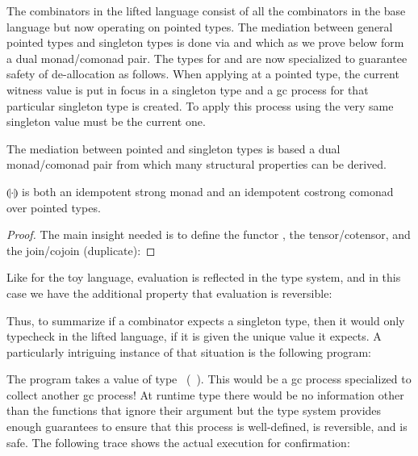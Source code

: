 \documentclass[sigplan,10pt,review,anonymous]{acmart}
\newcommand{\Afun}[1]{\AgdaFunction{#1}}
\newcommand{\Acon}[1]{\AgdaInductiveConstructor{#1}}
\newcommand{\Avar}[1]{\AgdaBound{#1}}
\begin{document}
The combinators in the lifted language consist of all the combinators
in the base language but now operating on pointed types. The mediation
between general pointed types and singleton types is done via
\Acon{return} and \Acon{extract} which as we prove below form a
dual monad/comonad pair. The types for \Acon{$\eta$} and
\Acon{$\epsilon$} are now specialized to guarantee safety of
de-allocation as follows. When applying \Acon{$\eta$} at a pointed type, the
current witness value is put in focus in a singleton type and a gc
process for that particular singleton type is created. To apply this
process using \Acon{$\epsilon$} the very same singleton value must be
the current one. 

\PIPFCombDef{}

The mediation between pointed and singleton types is based a dual
monad/comonad pair from which many structural properties can be
derived.

\begin{proposition}
  $\llparenthesis \cdot \rrparenthesis$ is both an idempotent strong
  monad and an idempotent costrong comonad over pointed types.
\end{proposition}
\begin{proof}
  The main insight needed is to define the functor \Afun{∙Singᵤ}, the
  tensor/cotensor, and the join/cojoin (duplicate):
\PIPFCombderive{}
\end{proof}

Like for the toy language, evaluation is reflected in the type
system, and in this case we have the additional property that
evaluation is reversible:

\PIPFeval{} 

\vspace{-\baselineskip}

\PIPFrev{}

Thus, to summarize if a combinator expects a singleton type, then it
would only typecheck in the lifted language, if it is given the unique
value it expects. A particularly intriguing instance of that
situation is the following program:

\begin{center}

\end{center}

\PIPFrevrev{}

The program takes a value of type
\Acon{∙𝟙/}~(\Acon{∙𝟙/}~\Avar{A}). This would be a gc process
specialized to collect another gc process! At runtime type there would
be no information other than the functions that ignore their argument
but the type system provides enough guarantees to ensure that this
process is well-defined, is reversible, and is safe. The following
trace shows the actual execution for confirmation:
\end{document}
